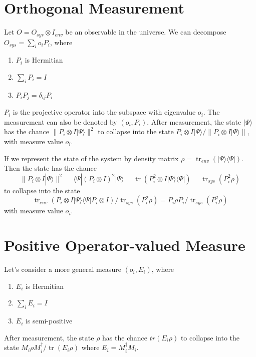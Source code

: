 \documentclass[12pt]{book}
\DeclareMathOperator{\tr}{tr}
\begin{document}
\section{Orthogonal Measurement}

Let $O=O_{sys}\otimes I_{env}$ be an observable in the universe. We can decompose $O_{sys}=\sum_i o_iP_i$, where
\begin{enumerate}
	\item $P_i$ is Hermitian
	\item $\sum_i P_i=I$
	\item $P_iP_j=\delta_{ij}P_i$
\end{enumerate}
$P_i$ is the projective operator into the subspace with eigenvalue $o_i$. The measurement can also be denoted by $(o_i,P_i)$. After measurement, the state $|\Psi\rangle$ has the chance $\parallel P_i\otimes I|\Psi\rangle\parallel^2$ to collapse into the state $P_i\otimes I|\Psi\rangle/\parallel P_i\otimes I|\Psi\rangle\parallel$, with measure value $o_i$.

If we represent the state of the system by density matrix $\rho=\tr_{env}(|\Psi\rangle\langle\Psi|)$. Then the state has the chance
\begin{equation}
	\parallel P_i\otimes I|\Psi\rangle\parallel^2=\langle \Psi|( P_i\otimes I)^2|\Psi\rangle=\tr(P_i^2\otimes I|\Psi\rangle\langle\Psi|)=\tr_{sys}(P_i^2\rho)
\end{equation}
to collapse into the state
\begin{equation}
	\tr_{env}(P_i\otimes I|\Psi\rangle\langle\Psi|P_i\otimes I)/\tr_{sys}(P_i^2\rho )=P_i\rho P_i/\tr_{sys}(P_i^2\rho)
\end{equation}
with measure value $o_i$.

\section{Positive Operator-valued Measure}

Let's consider a more general measure $(o_i,E_i)$, where
\begin{enumerate}
	\item $E_i$ is Hermitian
	\item $\sum_i E_i=I$
	\item $E_i$ is semi-positive
\end{enumerate}

After measurement, the state $\rho$ has the chance $tr(E_i\rho)$ to collapse into the state $M_i\rho M_i^\dagger/\tr(E_i\rho)$ where $E_i=M_i^\dagger M_i$.
\end{document}
